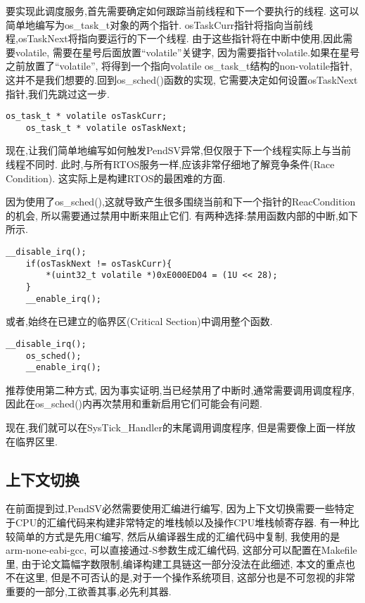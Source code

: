 要实现此调度服务,首先需要确定如何跟踪当前线程和下一个要执行的线程.
这可以简单地编写为os\_task\_t对象的两个指针.
osTaskCurr指针将指向当前线程,osTaskNext将指向要运行的下一个线程.
由于这些指针将在中断中使用,因此需要volatile,
需要在星号后面放置“volatile”关键字,
因为需要指针volatile.如果在星号之前放置了“volatile”,
将得到一个指向volatile os\_task\_t结构的non-volatile指针,这并不是我们想要的.回到os\_sched()函数的实现,
它需要决定如何设置osTaskNext指针,我们先跳过这一步.
\begin{lstlisting}[language={[ANSI]C},keywordstyle=\color{blue!70},commentstyle=\color{red!50!green!50!blue!50},frame=shadowbox, rulesepcolor=\color{red!20!green!20!blue!20}]
    os_task_t * volatile osTaskCurr;
    os_task_t * volatile osTaskNext;
\end{lstlisting}
现在,让我们简单地编写如何触发PendSV异常,但仅限于下一个线程实际上与当前线程不同时.
此时,与所有RTOS服务一样,应该非常仔细地了解竞争条件(Race Condition).
这实际上是构建RTOS的最困难的方面.

因为使用了os\_sched(),这就导致产生很多围绕当前和下一个指针的ReacCondition的机会,
所以需要通过禁用中断来阻止它们.
有两种选择:禁用函数内部的中断,如下所示.
\begin{lstlisting}[language={[ANSI]C},keywordstyle=\color{blue!70},commentstyle=\color{red!50!green!50!blue!50},frame=shadowbox, rulesepcolor=\color{red!20!green!20!blue!20}]
    __disable_irq();
    if(osTaskNext != osTaskCurr){
        *(uint32_t volatile *)0xE000ED04 = (1U << 28);
    }
    __enable_irq();
\end{lstlisting}
或者,始终在已建立的临界区(Critical Section)中调用整个函数.
\begin{lstlisting}[language={[ANSI]C},keywordstyle=\color{blue!70},commentstyle=\color{red!50!green!50!blue!50},frame=shadowbox, rulesepcolor=\color{red!20!green!20!blue!20}]
    __disable_irq();
    os_sched();
    __enable_irq();
\end{lstlisting}
推荐使用第二种方式,
因为事实证明,当已经禁用了中断时,通常需要调用调度程序,
因此在os\_sched()内再次禁用和重新启用它们可能会有问题.

现在,我们就可以在SysTick\_Handler的末尾调用调度程序,
但是需要像上面一样放在临界区里.

\subsection{上下文切换}

在前面提到过,PendSV必然需要使用汇编进行编写,
因为上下文切换需要一些特定于CPU的汇编代码来构建非常特定的堆栈帧以及操作CPU堆栈帧寄存器.
有一种比较简单的方式是先用C编写,
然后从编译器生成的汇编代码中复制,
我使用的是arm-none-eabi-gcc,
可以直接通过-S参数生成汇编代码,
这部分可以配置在Makefile里,
由于论文篇幅字数限制,编译构建工具链这一部分没法在此细述,
本文的重点也不在这里,
但是不可否认的是,对于一个操作系统项目,
这部分也是不可忽视的非常重要的一部分,工欲善其事,必先利其器.

